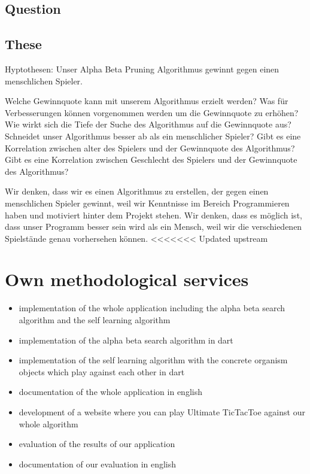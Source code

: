 \subsection{Question} %

\subsection{These}
Hyptothesen:
Unser Alpha Beta Pruning Algorithmus gewinnt gegen einen menschlichen Spieler.

Welche Gewinnquote kann mit unserem Algorithmus erzielt werden?
Was für Verbesserungen können vorgenommen werden um die Gewinnquote zu erhöhen?
Wie wirkt sich die Tiefe der Suche des Algorithmus auf die Gewinnquote aus?
Schneidet unser Algorithmus besser ab als ein menschlicher Spieler?
Gibt es eine Korrelation zwischen alter des Spielers und der Gewinnquote des Algorithmus?
Gibt es eine Korrelation zwischen Geschlecht des Spielers und der Gewinnquote des Algorithmus?

Wir denken, dass wir es  einen Algorithmus zu erstellen, der gegen einen menschlichen Spieler gewinnt, weil wir Kenntnisse im Bereich Programmieren haben und motiviert hinter dem Projekt stehen.
Wir denken, dass es möglich ist, dass unser Programm besser sein wird als ein Mensch, weil wir die verschiedenen Spielstände genau vorhersehen können.
<<<<<<< Updated upstream


\section{Own methodological services}
\begin{itemize}
    \item implementation of the whole application including the alpha beta search algorithm and the self learning algorithm
    \item implementation of the alpha beta search algorithm in dart
    \item implementation of the self learning algorithm with the concrete organism objects which play against each other in dart
    \item documentation of the whole application in english
    \item development of a website where you can play Ultimate TicTacToe against our whole algorithm
    \item evaluation of the results of our application
    \item documentation of our evaluation in english
\end{itemize}


